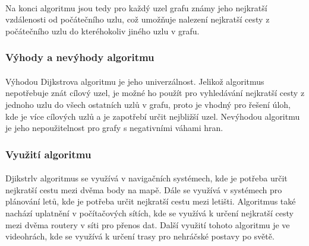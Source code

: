 \documentclass[12pt, titlepage, a4paper]{article}
\begin{document}
\paragraph{}
Na konci algoritmu jsou tedy pro každý uzel grafu známy jeho nejkratší vzdálenosti od
počátečního uzlu, což umožňuje nalezení nejkratší cesty z počátečního uzlu do kteréhokoliv
jiného uzlu v grafu.

\subsubsection{Výhody a nevýhody algoritmu}
\paragraph{}
Výhodou Dijkstrova algoritmu je jeho univerzálnost. Jelikož algoritmus nepotřebuje znát
cílový uzel, je možné ho použít pro vyhledávání nejkratší cesty z jednoho uzlu do všech
ostatních uzlů v grafu, proto je vhodný pro řešení úloh, kde je více cílových uzlů a je
zapotřebí určit nejbližší uzel. Nevýhodou algoritmu je jeho nepoužitelnost pro grafy s
negativními váhami hran.

\subsubsection{Využití algoritmu}
\paragraph{}
Djikstrlv algoritmus se využívá v navigačních systémech, kde je potřeba určit nejkratší cestu
mezi dvěma body na mapě. Dále se využívá v systémech pro plánování letů, kde je potřeba určit
nejkratší cestu mezi letišti. Algoritmus také nachází uplatnění v počítačových sítích, kde se
využívá k určení nejkratší cesty mezi dvěma routery v síti pro přenos dat. Další využití
tohoto algoritmu je ve videohrách, kde se využívá k určení trasy pro nehráčské postavy po světě.
\end{document}
